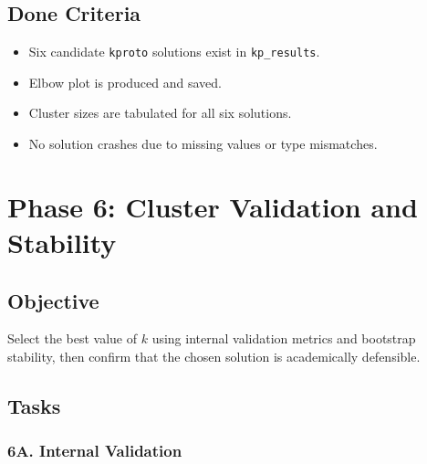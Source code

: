\documentclass[11pt]{article}
\begin{document}
\subsection{Done Criteria}

\begin{itemize}
  \item Six candidate \texttt{kproto} solutions exist in \texttt{kp\_results}.
  \item Elbow plot is produced and saved.
  \item Cluster sizes are tabulated for all six solutions.
  \item No solution crashes due to missing values or type mismatches.
\end{itemize}

\newpage
\section{Phase 6: Cluster Validation and Stability}

\subsection{Objective}

Select the best value of $k$ using internal validation metrics and bootstrap stability, then confirm that the chosen solution is academically defensible.

\subsection{Tasks}

\subsubsection*{6A. Internal Validation}
\end{document}

